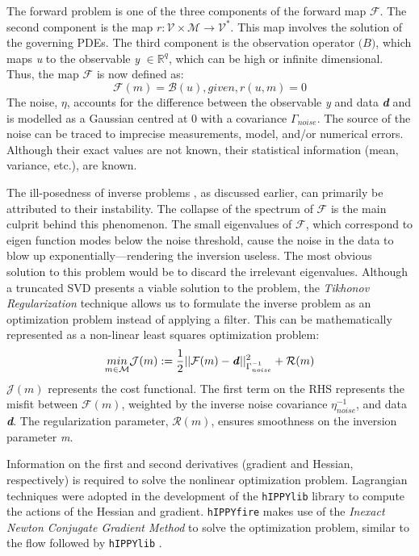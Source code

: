The forward problem is one of the three components of the forward map $\mathcal{F}$. The second component is the map $r: \mathcal{V} \times \mathcal{M} \rightarrow \mathcal{V}^*$. This map involves the solution of the governing PDEs. The third component is the observation operator $\mathcal(B)$, which maps \textit{u} to the observable \textit{y} $\in \mathbb{R}^q$, which can be high or infinite dimensional. Thus, the map $\mathcal{F}$ is now defined as:
\begin{equation}
    \mathcal{F}(m) = \mathcal{B}(u), given, r(u, m) = 0
\end{equation}
The noise, $\eta$, accounts for the difference between the observable \textit{y} and data \textit{\textbf{d}} and is modelled as a Gaussian centred at 0 with a covariance $\Gamma_{noise}$. The source of the noise can be traced to imprecise measurements, model, and/or numerical errors. Although their exact values are not known, their statistical information (mean, variance, etc.), are known.

The ill-posedness of inverse problems \cite{tikhonov1963solution}, as discussed earlier, can primarily be attributed to their instability. The collapse of the spectrum of $\mathcal{F}$ is the main culprit behind this phenomenon. The small eigenvalues of $\mathcal{F}$, which correspond to eigen function modes below the noise threshold, cause the noise in the data to blow up exponentially---rendering the inversion useless. The most obvious solution to this problem would be to discard the irrelevant eigenvalues. Although a truncated SVD presents a viable solution to the problem, the \textit{Tikhonov Regularization} technique \cite{golub1999tikhonov} allows us to formulate the inverse problem as an optimization problem instead of applying a filter. This can be mathematically represented as a non-linear least squares optimization problem:
\begin{equation}
\label{eqn:deterministic2}
    \underset{m \in \mathcal{M}}{min}\mathcal{J}(m) := \frac{1}{2} ||\mathcal{F}(m) - \textbf{\textit{d}} ||^2_{\Gamma^{-1}_{noise}} + \mathcal{R}(m)
\end{equation}
$\mathcal{J}(m)$ represents the cost functional. The first term on the RHS represents the misfit between $\mathcal{F}(m)$, weighted by the inverse noise covariance $\eta^{-1}_{noise}$, and data \textit{\textbf{d}}. The regularization parameter, $\mathcal{R}(m)$, ensures smoothness on the inversion parameter \textit{m}.

Information on the first and second derivatives (gradient and Hessian, respectively) is required to solve the nonlinear optimization problem. Lagrangian techniques \cite{troltzsch2010optimal} were adopted in the development of the \texttt{hIPPYlib} library \cite{villa2018hippylib} to compute the actions of the Hessian and gradient. \texttt{hIPPYfire} makes use of the \textit{Inexact Newton Conjugate Gradient Method} to solve the optimization problem, similar to the flow followed by \texttt{hIPPYlib} \cite{villa2018hippylib}.

